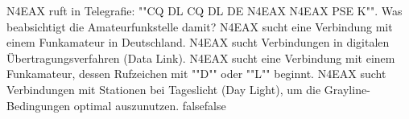     {N4EAX ruft in Telegrafie: ""CQ DL CQ DL DE N4EAX N4EAX PSE K"". Was beabsichtigt die Amateurfunkstelle damit?}
    {N4EAX sucht eine Verbindung mit einem Funkamateur in Deutschland.}
    {N4EAX sucht Verbindungen in digitalen Übertragungsverfahren (Data Link).}
    {N4EAX sucht eine Verbindung mit einem Funkamateur, dessen Rufzeichen mit ""D"" oder ""L"" beginnt.}
    {N4EAX sucht Verbindungen mit Stationen bei Tageslicht (Day Light), um die Grayline-Bedingungen optimal auszunutzen.}
    {false}{false}